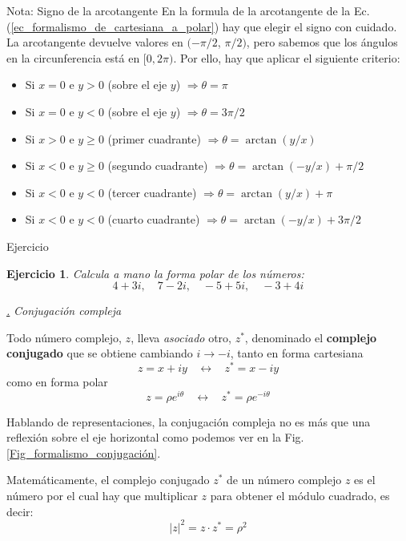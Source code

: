 \documentclass[a4paper,11pt]{book} %
\newtheorem{ejercicio_contador}{Ejercicio}
\newcommand{\Ejercicio}[1]{
		\begin{mybox_gray}{Ejercicio} 
			\begin{ejercicio_contador}
				 #1 
			\end{ejercicio_contador} 
		\end{mybox_gray}
	}
\numberwithin{equation}{chapter}
\def\subsubiContadorIt{\par\addtocounter{subsubsection}{1}\underline{\it\thesubsubsection.}\hskip0.5cm \setcounter{subsubsubsectionIt}{0}}
\newcommand{\SubsubiIt}[1]{
		\subsubiContadorIt \textit{#1}
	}
\newcounter{subsubsubsectionIt}[subsubsection]
\begin{document}
	\begin{mybox_blue}{Nota: Signo de la arcotangente}
	En la formula de la arcotangente de la Ec. (\ref{ec_formalismo_de_cartesiana_a_polar}) hay que elegir el signo con cuidado. La arcotangente devuelve valores en $(-\pi/2$, $\pi/2)$, pero sabemos que los ángulos en la circunferencia está en  $[0,2\pi)$. Por ello, hay que aplicar el siguiente criterio:
	\begin{itemize}
		\item Si $x=0$ e $y>0$ (sobre el eje $y$) $\Rightarrow \theta = \pi$
		\item Si $x=0$ e $y<0$ (sobre el eje $y$) $ \Rightarrow \theta = 3\pi/2$
		\item Si $x>0$ e $y \geq 0$ (primer cuadrante) $ \Rightarrow \theta = \arctan (y/x)$
		\item Si $x<0$ e $y \geq 0$ (segundo cuadrante) $ \Rightarrow \theta = \arctan (-y/x) + \pi/2$
		\item Si $x<0$ e $y<0$ (tercer cuadrante) $ \Rightarrow \theta = \arctan (y/x) + \pi$
		\item Si $x<0$ e $y<0$ (cuarto cuadrante) $ \Rightarrow \theta = \arctan (-y/x) + 3\pi/2$
	\end{itemize}
	\end{mybox_blue}

	\Ejercicio{
	Calcula a mano la forma polar de los números: 
	\begin{equation}
	4 + 3i, \quad 7 - 2i, \quad - 5 + 5i, \quad - 3 + 4i
	\end{equation}
	}
			
			
			\SubsubiIt{Conjugación compleja}

Todo número complejo, $z$, lleva \textit{asociado} otro, $z^*$, denominado el \textbf{complejo conjugado} que se obtiene cambiando $i \to -i$, tanto en forma cartesiana
	\begin{equation}
	\boxed{z = x+i y ~~~~\leftrightarrow~~~~ z^* = x - i y}
	\end{equation}
como en forma polar
	\begin{equation}
	\boxed{z = \rho e^{i \theta} ~~~~\leftrightarrow~~~~ z^* = \rho e^{- i \theta}}
	\end{equation}

Hablando de representaciones, la conjugación compleja no es más que una reflexión sobre el eje horizontal como podemos ver en la Fig. \ref{Fig_formalismo_conjugación}.

Matemáticamente, el complejo conjugado $z^*$ de un número complejo $z$ es el número por el cual hay que multiplicar $z$ para obtener el módulo cuadrado, es decir:
	\begin{equation}
	\boxed{|z|^2 = z \cdot z^* = \rho^2}
	\end{equation}
			
\end{document}
